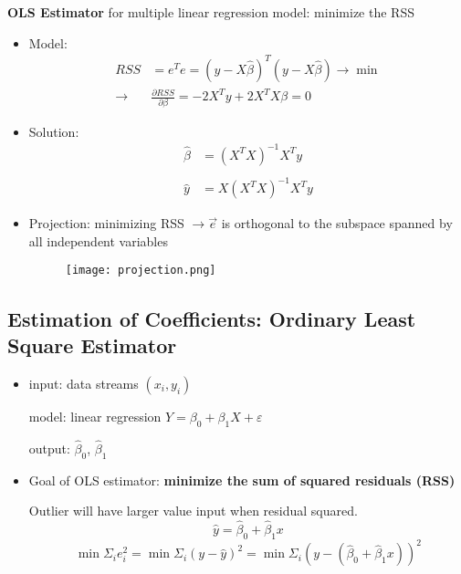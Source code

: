 \textbf{OLS Estimator} for multiple linear regression model: minimize the RSS
\begin{itemize}
	\item Model:
	\begin{align*}
		RSS  &= e^{T} e = (y - X\hat{\beta})^T (y - X\hat{\beta}) \rightarrow \min \\
		\rightarrow  &\frac{\partial RSS}{\partial \beta} = -2X^Ty + 2X^TX\beta= 0
	\end{align*}
	
	\item Solution:
	\begin{align*}
		\hat{\beta} &= (X^TX)^{-1}X^Ty \\ \ \\
		\hat{y} &= X(X^TX)^{-1}X^Ty
	\end{align*}
	
	\item Projection: minimizing RSS $\rightarrow \vec{e}$ is orthogonal to the subspace spanned by all independent variables
	\begin{figure}[H]
		\centering
		\texttt{[image: projection.png]}
	\end{figure}
\end{itemize}

\subsection{Estimation of Coefficients: Ordinary Least Square Estimator}
\begin{itemize}
	\item input: data streams $(x_i, y_i)$
		  
		  model: linear regression $Y = \beta_0 + \beta_1 X + \varepsilon$ 
		  
		  output: $\hat{\beta}_0$, $\hat{\beta}_1$
	\item Goal of OLS estimator: \textbf{minimize the sum of squared residuals (RSS) } 
	
	Outlier will have larger value input when residual squared.
	$$\hat{y} = \hat{\beta}_0 + \hat{\beta}_1 x$$
	$$\min{\Sigma_i e_i^2} = \min{\Sigma_i (y - \hat{y})^2} = \min{\Sigma_i (y - (\hat{\beta}_0 + \hat{\beta}_1 x))^2} $$
	
\end{itemize}
